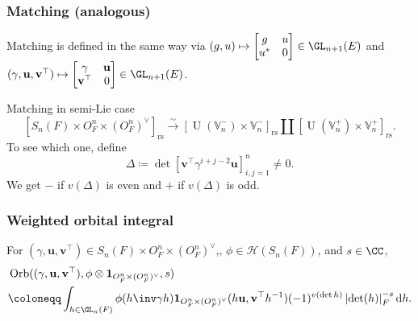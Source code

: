 \documentclass[11pt]{beamer}
\DeclareMathOperator{\Orb}{Orb}
\DeclareMathOperator{\U}{U}
\newcommand{\HH}{\mathcal{H}}
\newcommand{\VV}{\mathbb{V}}
\renewcommand{\OO}{O}
\newcommand{\guv}{{(\gamma, \uu, \vv^\top)}}
\newcommand{\oneV}{\mathbf{1}_{\OO_F^n \times (\OO_F^n)^\vee}}
\newcommand{\rs}{_{\text{rs}}}
\newcommand{\uu}{\mathbf{u}}
\newcommand{\vv}{\mathbf{v}}
\begin{document}
\begin{frame}
  \frametitle{Matching (analogous)}
  Matching is defined in the same way via
  $(g,u) \mapsto \begin{bmatrix} g & u \\ u^\ast & 0 \end{bmatrix} \in \GL_{n+1}(E)$
  and $\guv \mapsto \begin{bmatrix} \gamma & \uu \\ \vv^\top & 0 \end{bmatrix} \in \GL_{n+1}(E)$.

  \begin{block}{Matching in semi-Lie case}
  \[ [S_n(F) \times \OO_F^n \times (\OO_F^n)^\vee]\rs \xrightarrow{\sim} [\U(\VV_n^-) \times \VV_n^-]\rs \amalg [\U(\VV_n^+) \times \VV_n^+]\rs. \]
  To see which one, define
  \[ \Delta \coloneqq \det \left[ \vv^\top \gamma^{i+j-2} \uu \right]_{i,j=1}^n \neq 0. \]
  We get $-$ if $v(\Delta)$ is even
  and $+$ if $v(\Delta)$ is odd.
  \end{block}
\end{frame}

\begin{frame}
  \frametitle{Weighted orbital integral}
  For $\guv \in S_n(F) \times \OO_F^n \times (\OO_F^n)^\vee$,,
  $\phi \in \HH(S_n(F))$, and $s \in \CC$,
  \begin{align*}
    & \Orb((\gamma, \uu, \vv^\top), \phi \otimes \oneV, s) \\
    &\coloneqq \int_{h \in \GL_n(F)} \phi(h\inv \gamma h) \oneV(h \uu, \vv^\top h^{-1})
      (-1)^{v(\det h)} \left\lvert \det(h) \right\rvert_F^{-s} \odif h.
  \end{align*}
\end{frame}
\end{document}
